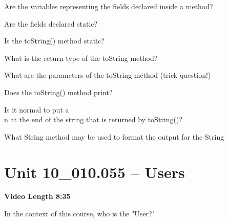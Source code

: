 \documentclass[letterpaper,12pt]{exam}
\newcommand{\unit}{Unit 10}
\begin{document}
\begin{questions}
\begin{samepage}
    \question Are the variables representing the fields declared inside a method?
    \vspace{5mm}
\end{samepage}

\begin{samepage}
    \question Are the fields declared static?
    \vspace{5mm}
\end{samepage}

\begin{samepage}
    \question Is the toString() method static?
    \vspace{5mm}
\end{samepage}
\begin{samepage}
    \question What is the return type of the toString method?
    \vspace{5mm}
\end{samepage}
\begin{samepage}
    \question What are the parameters of the toString method (trick question!)
    \vspace{5mm}
\end{samepage}
\begin{samepage}
    \question Does the toString() method print?
    \vspace{5mm}
\end{samepage}
\begin{samepage}
    \question Is it normal to put a \\n at the end of the string that is returned by toString()?
    \vspace{5mm}
\end{samepage}
\begin{samepage}
    \question What String method may be used to format the output for the String
    \vspace{5mm}
\end{samepage}


\section*{\unit\_010.055 -- Users} 
\par{\selectfont\textbf{Video Length  8:35}}

\begin{samepage}
    \question In the context of this course, who is the "User?"
    \vspace{5mm}
\end{samepage}


\end{questions}
\end{document}
